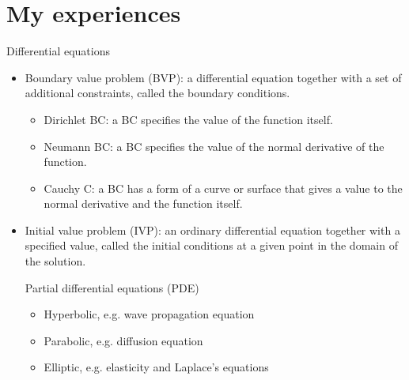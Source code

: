 \documentclass[12pt]{report}
\renewcommand{\_}{\kern-1.5pt\textunderscore\kern-1.5pt}
\begin{document}

\newpage

\vspace{\baselineskip}\section*{My experiences}
Differential equations\par

\begin{itemize}
	\item Boundary value problem (BVP): a differential equation together with a set of additional constraints, called the boundary conditions.\par

\begin{itemize}
	\item Dirichlet BC: a BC specifies the value of the function itself.\par

	\item Neumann BC: a BC specifies the value of the normal derivative of the function. \par

	\item Cauchy C: a BC has a form of a curve or surface that gives a value to the normal derivative and the function itself. \par


\end{itemize}
	\item Initial value problem (IVP): an ordinary differential equation together with a specified value, called the initial conditions at a given point in the domain of the solution.\par

Partial differential equations (PDE)\par

\begin{itemize}
	\item Hyperbolic, e.g. wave propagation equation\par

	\item Parabolic, e.g. diffusion equation\par

	\item Elliptic, e.g. elasticity and Laplace’s equations\par


\end{itemize}
\end{itemize}
\end{document}
